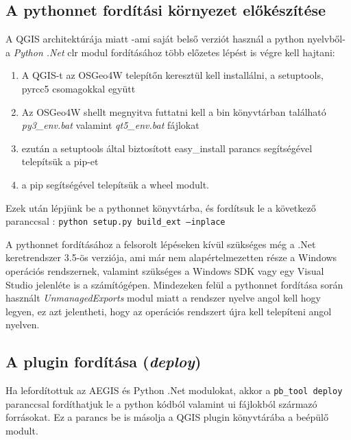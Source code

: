 \subsection{A pythonnet fordítási környezet előkészítése}
A QGIS architektúrája miatt -ami saját belső verziót használ a python nyelvből- a \emph{Python .Net} clr modul fordításához több előzetes lépést is végre kell hajtani:
\begin{enumerate}
	\item A QGIS-t az OSGeo4W telepítőn keresztül kell installálni, a setuptools, pyrcc5 csomagokkal együtt
	\item Az OSGeo4W shellt megnyitva futtatni kell a bin könyvtárban található \emph{py3\_env.bat} valamint \emph{qt5\_env.bat} fájlokat
	\item ezután a setuptools által biztosított easy\_install parancs segítségével telepítsük a pip-et
	\item a pip segítségével telepítsük a wheel modult.
\end{enumerate}
Ezek után lépjünk be a pythonnet könyvtárba, és fordítsuk le a következő paranccsal : \texttt{python setup.py build\_ext --inplace} 
\begin{note}
A pythonnet fordításához a felsorolt lépéseken kívül szükséges még a .Net keretrendszer 3.5-ös verziója, ami már nem alapértelmezetten része a Windows operációs rendszernek, valamint szükséges a Windows SDK vagy egy Visual Studio jelenléte is a számítógépen. Mindezeken felül a pythonnet fordítása során használt \emph{UnmanagedExports} modul miatt a rendszer nyelve angol kell hogy legyen, ez azt jelentheti, hogy az operációs rendszert újra kell telepíteni angol nyelven.
\end{note}
\subsection{A plugin fordítása (\emph{deploy})}
Ha lefordítottuk az AEGIS és Python .Net modulokat, akkor a \texttt{pb\_tool deploy} paranccsal fordíthatjuk le a python kódból valamint ui fájlokból származó forrásokat. Ez a parancs be is másolja a QGIS plugin könyvtárába a beépülő modult.

